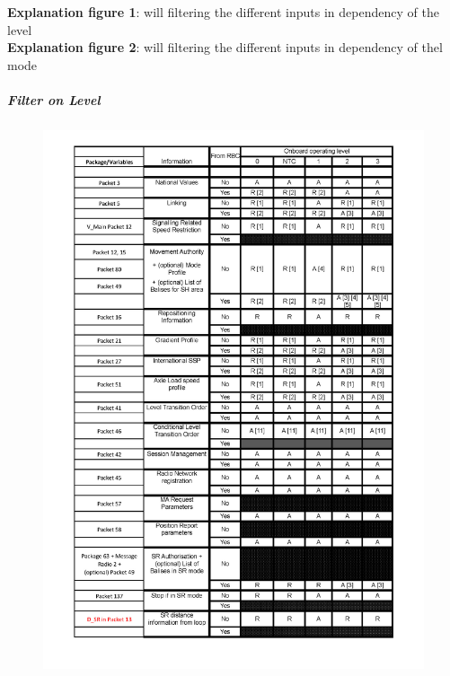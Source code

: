 \textbf {Explanation figure 1}: will filtering the different inputs in dependency of the level\\
\textbf {Explanation figure 2}: will filtering the different inputs in dependency of thel mode\\

\subparagraph{Filter on Level}
\begin{figure}[hbtp]
\centering
\includegraphics [scale=0.6]{images/LevelFilter1}
\end{figure}
